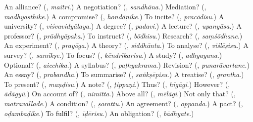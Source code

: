 \begin{tcolorbox}[breakable,colback=teal!4,colframe=teal!35!black,title={Before you move on}]
An alliance? (\textbf{}, \emph{maitri}.) A negotiation? (\textbf{}, \emph{sandhāna}.) Mediation? (\textbf{}, \emph{madhyasthike}.) A compromise? (\textbf{}, \emph{hondāṇike}.) To incite? (\textbf{}, \emph{pracōdisu}.) A university? (\textbf{}, \emph{viśvavidyālaya}.) A degree? (\textbf{}, \emph{padavi}.) A lecture? (\textbf{}, \emph{upanyāsa}.) A professor? (\textbf{}, \emph{prādhyāpaka}.) To instruct? (\textbf{}, \emph{bōdhisu}.) Research? (\textbf{}, \emph{saṃśōdhane}.) An experiment? (\textbf{}, \emph{prayōga}.) A theory? (\textbf{}, \emph{siddhānta}.) To analyse? (\textbf{}, \emph{viślēṣisu}.) A survey? (\textbf{}, \emph{samīkṣe}.) To focus? (\textbf{}, \emph{kēndrīkarisu}.) A study? (\textbf{}, \emph{adhyayana}.) Optional? (\textbf{}, \emph{aicchika}.) A syllabus? (\textbf{}, \emph{paṭhyakrama}.) Revision? (\textbf{}, \emph{punarāvartane}.) An essay? (\textbf{}, \emph{prabandha}.) To summarise? (\textbf{}, \emph{saṅkṣēpisu}.) A treatise? (\textbf{}, \emph{grantha}.) To present? (\textbf{}, \emph{maṇḍisu}.) A note? (\textbf{}, \emph{ṭippaṇi}.) Thus? (\textbf{}, \emph{hīgāgi}.) However? (\textbf{}, \emph{ādāgyū}.) On account of? (\textbf{}, \emph{nimitta}.) Above all? (\textbf{}, \emph{mēlāgi}.) Not only that? (\textbf{}, \emph{mātravallade}.) A condition? (\textbf{}, \emph{ṣarattu}.) An agreement? (\textbf{}, \emph{oppanda}.) A pact? (\textbf{}, \emph{oḍambaḍike}.) To fulfil? (\textbf{}, \emph{īḍērisu}.) An obligation? (\textbf{}, \emph{bādhyate}.)
\end{tcolorbox}
